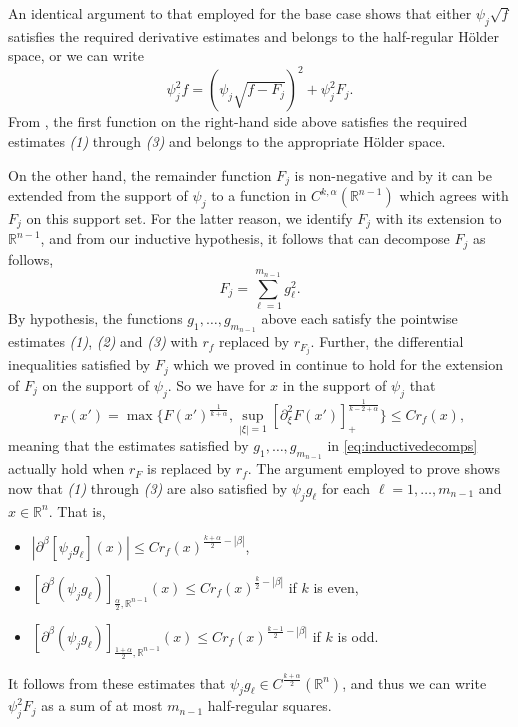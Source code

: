 \documentclass[oneside,hidelinks,indentfirst,10pt]{book}
\begin{document}
An identical argument to that employed for the base case shows that either \(\psi_j\sqrt{f}\) satisfies the required derivative estimates and belongs to the half-regular H\"older space, or we can write 
\[
    \psi_j^2f=(\psi_j\sqrt{f-F_j})^2+\psi_j^2F_j.
\]
From , the first function on the right-hand side above satisfies the required estimates \textit{(1)} through \textit{(3)} and belongs to the appropriate H\"older space. 


On the other hand, the remainder function \(F_j\) is non-negative and by  it can be extended from the support of \(\psi_j\) to a function in \(C^{k,\alpha}(\mathbb{R}^{n-1})\) which agrees with \(F_j\) on this support set. For the latter reason, we identify \(F_j\) with its extension to \(\mathbb{R}^{n-1}\), and from our inductive hypothesis, it follows that can decompose \(F_j\) as follows,
\begin{equation}\label{eq:inductivedecomps}
    F_j=\sum_{\ell=1}^{m_{n-1}}g_\ell^2.
\end{equation}
By hypothesis, the functions \(g_1,\dots,g_{m_{n-1}}\) above each satisfy the pointwise estimates \textit{(1)}, \textit{(2)} and \textit{(3)} with \(r_f\) replaced by \(r_{F_j}\). Further, the differential inequalities satisfied by \(F_j\) which we proved in  continue to hold for the extension of \(F_j\) on the support of \(\psi_j\). So we have for \(x\) in the support of \(\psi_j\) that
\[
    r_F(x')=\max\{F(x')^\frac{1}{k+\alpha},\sup_{|\xi|=1}[\partial^2_\xi F(x')]_+^\frac{1}{k-2+\alpha}\}\leq Cr_f(x),
\]
meaning that the estimates satisfied by \(g_1,\dots,g_{m_{n-1}}\) in \eqref{eq:inductivedecomps} actually hold when \(r_F\) is replaced by \(r_f\). The argument employed to prove  shows now that \textit{(1)} through \textit{(3)} are also satisfied by \(\psi_jg_\ell\) for each \(\ell=1,\dots,m_{n-1}\) and \(x\in\mathbb{R}^n\). That is,
\begin{itemize}
    \item[\textit{(1)}] \(|\partial^\beta[\psi_j g_\ell](x)|\leq Cr_f(x)^{\frac{k+\alpha}{2}-|\beta|}\),
    \item[\textit{(2)}] \([\partial^\beta(\psi_j g_\ell)]_{\frac{\alpha}{2},\mathbb{R}^{n-1}}(x)\leq Cr_f(x)^{\frac{k}{2}-|\beta|}\) if \(k\) is even,
    \item[\textit{(3)}] \([\partial^\beta (\psi_jg_\ell)]_{\frac{1+\alpha}{2},\mathbb{R}^{n-1}}(x)\leq Cr_f(x)^{\frac{k-1}{2}-|\beta|}\) if \(k\) is odd.
\end{itemize}
It follows from these estimates that \(\psi_j g_\ell\in C^\frac{k+\alpha}{2}(\mathbb{R}^n)\), and thus we can write \(\psi_j^2F_j\) as a sum of at most \(m_{n-1}\) half-regular squares. 
\end{document}
